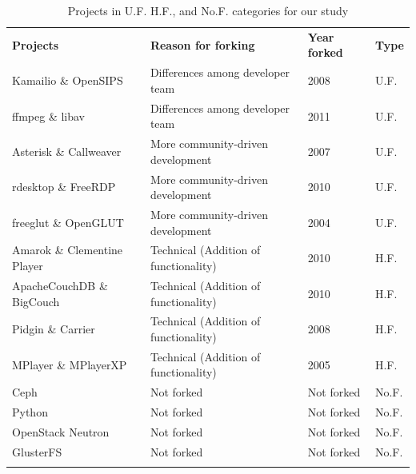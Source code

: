 \documentclass[11pt]{report}
\begin{document}
\begin{table}[!ht]
\centering
\caption{Projects in U.F. H.F., and No.F. categories  for our study}
\label{forkedProjectsDataCollected}
\begin{tabular}{p{} p{} p{} p{}}
\hline\noalign{\smallskip}
\textbf{Projects} & \textbf{Reason for forking} & \textbf{Year forked} & \textbf{Type}\\
\noalign{\smallskip}\hline\noalign{\smallskip}
Kamailio \& OpenSIPS & Differences among developer team & 2008 & U.F.\\ \hline
ffmpeg \& libav & Differences among developer team & 2011 & U.F.\\ \hline
Asterisk \& Callweaver & More community-driven development & 2007 & U.F.\\ \hline
rdesktop \& FreeRDP  & More community-driven development & 2010 & U.F.\\ \hline
freeglut \& OpenGLUT & More community-driven development & 2004 & U.F.\\ \hline
Amarok \& Clementine Player & Technical (Addition of functionality) & 2010 & H.F.\\ \hline
ApacheCouchDB \& BigCouch & Technical (Addition of functionality) & 2010 & H.F.\\ \hline
Pidgin \& Carrier & Technical (Addition of functionality) & 2008 & H.F.\\ \hline
MPlayer \& MPlayerXP & Technical (Addition of functionality) & 2005 & H.F.\\ \hline
Ceph  & Not forked & Not forked & No.F.\\ \hline
Python & Not forked & Not forked & No.F.\\ \hline
OpenStack Neutron & Not forked & Not forked & No.F.\\ \hline
GlusterFS & Not forked & Not forked & No.F.\\ 
\noalign{\smallskip}\hline
\end{tabular}
\end{table}
\end{document}

